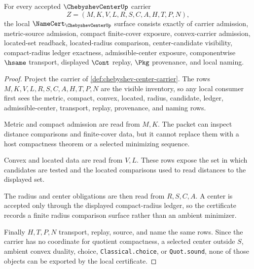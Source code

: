 \begin{theorem}
\label{thm:chebyshev-center-namecert-obligations}
For every accepted $\ChebyshevCenterUp$ carrier
$$
Z=(M,K,V,L,R,S,C,A,H,T,P,N),
$$
the local $\NameCert_{\ChebyshevCenterUp}$ surface consists exactly of carrier admission, metric-source admission, compact finite-cover exposure, convex-carrier admission, located-set readback, located-radius comparison, center-candidate visibility, compact-radius ledger exactness, admissible-center exposure, componentwise $\hsame$ transport, displayed $\Cont$ replay, $\Pkg$ provenance, and local naming.
\end{theorem}
\begin{proof}
Project the carrier of \autoref{def:chebyshev-center-carrier}. The rows $M,K,V,L,R,S,C,A,H,T,P,N$ are the visible inventory, so any local consumer first sees the metric, compact, convex, located, radius, candidate, ledger, admissible-center, transport, replay, provenance, and naming rows.

Metric and compact admission are read from $M,K$. The packet can inspect distance comparisons and finite-cover data, but it cannot replace them with a host compactness theorem or a selected minimizing sequence.

Convex and located data are read from $V,L$. These rows expose the set in which candidates are tested and the located comparisons used to read distances to the displayed set.

The radius and center obligations are then read from $R,S,C,A$. A center is accepted only through the displayed compact-radius ledger, so the certificate records a finite radius comparison surface rather than an ambient minimizer.

Finally $H,T,P,N$ transport, replay, source, and name the same rows. Since the carrier has no coordinate for quotient compactness, a selected center outside $S$, ambient convex duality, choice, \texttt{Classical.choice}, or \texttt{Quot.sound}, none of those objects can be exported by the local certificate.
\end{proof}

